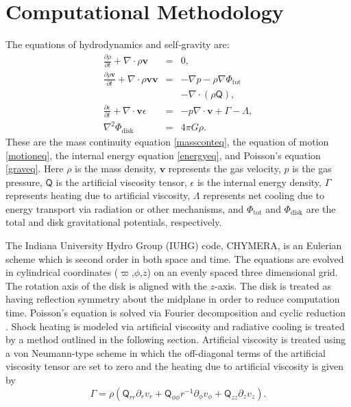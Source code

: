 \documentclass[12pt,preprint2]{aastex}
\begin{document}
\section{Computational Methodology}
\label{sec:method}

The equations of hydrodynamics and self-gravity are:
\begin{eqnarray}
\frac{\partial \rho}{\partial t} + \nabla \cdot \rho \boldsymbol{v} & = & 0,\label{massconteq}\\
\frac{\partial \rho \boldsymbol{v}}{\partial t} + \nabla \cdot \rho \boldsymbol{vv} & = & -\nabla p - \rho \nabla \Phi_{\mathrm{tot}}\nonumber\\
&& - \nabla \cdot (\rho \mathsf{Q}),\label{motioneq}\\
\frac{\partial \epsilon}{\partial t} + \nabla \cdot \boldsymbol{v} \epsilon & = & - p \nabla \cdot \boldsymbol{v} + \Gamma - \Lambda,\label{energyeq}\\
\nabla^2 \Phi_{\mathrm{disk}} & = & 4 \pi G \rho\label{graveq}.
\end{eqnarray}
These are the mass continuity equation \eqref{massconteq}, the equation of motion \eqref{motioneq}, the internal energy equation \eqref{energyeq}, and Poisson's equation \eqref{graveq}. Here $\rho$ is the mass density, $\mathbf{v}$ represents the gas velocity, $p$ is the gas pressure, $\mathsf{Q}$ is the artificial viscosity tensor, $\epsilon$ is the internal energy density, $\Gamma$ represents heating due to artificial viscosity, $\Lambda$ represents net cooling due to energy transport via radiation or other mechanisms, and $\Phi_{\mathrm{tot}}$ and $\Phi_{\mathrm{disk}}$ are the total and disk gravitational potentials, respectively.

The Indiana University Hydro Group (IUHG) code, CHYMERA, is an Eulerian scheme which is second order in both space and
time. The equations are evolved in cylindrical coordinates ($\varpi$,$\phi$,$z$) on an evenly spaced three dimensional
grid. The rotation axis of the disk is aligned with the $z$-axis. The disk is treated as having reflection symmetry about
the midplane in order to reduce computation time. Poisson's equation is solved via Fourier decomposition and cyclic
reduction \citep{tohline1980}. Shock heating is modeled via artificial viscosity \citep{pickettphd1995} and radiative
cooling is treated by a method outlined in the following section. Artificial viscosity is treated using a von
Neumann-type scheme \citep{norman1986} in which the off-diagonal terms of the artificial viscosity tensor are set to
zero and the heating due to artificial viscosity is given by
 \begin{equation}
 \Gamma = \rho(\mathsf{Q}_{rr}\partial_r v_r + \mathsf{Q}_{\phi\phi} r^{-1}\partial_\phi v_\phi + \mathsf{Q}_{zz} \partial_z v_z). 
\end{equation}
\end{document}
